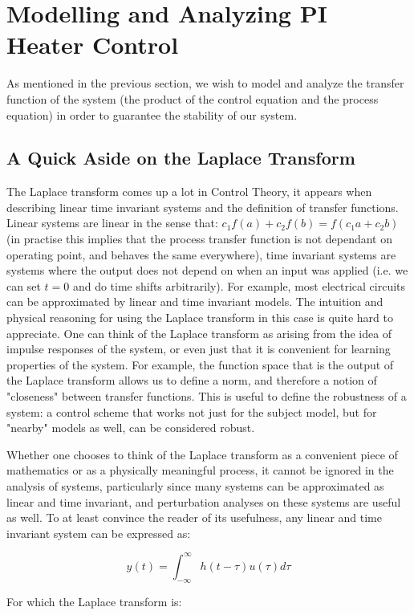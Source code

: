 \documentclass[11pt, letterpaper]{article}
\begin{document}
\section{Modelling and Analyzing PI Heater Control}
As mentioned in the previous section, we wish to model and analyze the transfer function of the system (the product of the control equation and the process equation) in order to guarantee the stability of our system. 

\subsection{A Quick Aside on the Laplace Transform}
The Laplace transform comes up a lot in Control Theory, it appears when describing linear time invariant systems and the definition of transfer functions. Linear systems are linear in the sense that: $c_1 f(a)+c_2 f(b) = f(c_1 a + c_2 b)$ (in practise this implies that the process transfer function is not dependant on operating point, and behaves the same everywhere), time invariant systems are systems where the output does not depend on when an input was applied (i.e. we can set $t=0$ and do time shifts arbitrarily). For example, most electrical circuits can be approximated by linear and time invariant models. The intuition and physical reasoning for using the Laplace transform in this case is quite hard to appreciate. One can think of the Laplace transform as arising from the idea of impulse responses of the system, or even just that it is convenient for learning properties of the system. For example, the function space that is the output of the Laplace transform allows us to define a norm, and therefore a notion of "closeness" between transfer functions. This is useful to define the robustness of a system: a control scheme that works not just for the subject model, but for "nearby" models as well, can be considered robust. 

Whether one chooses to think of the Laplace transform as a convenient piece of mathematics or as a physically meaningful process, it cannot be ignored in the analysis of systems, particularly since many systems can be approximated as linear and time invariant, and perturbation analyses on these systems are useful as well. To at least convince the reader of its usefulness, any linear and time invariant system can be expressed as:

$$ y(t) = \int_{-\infty}^{\infty} h(t-\tau)u(\tau)d\tau $$

For which the Laplace transform is:
\end{document}
